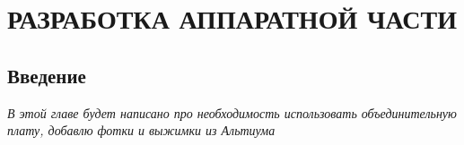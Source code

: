 \chapter{РАЗРАБОТКА АППАРАТНОЙ ЧАСТИ}
\section{Введение}

\textit{В этой главе будет написано про необходимость использовать объединительную плату, добавлю фотки и выжимки из Альтиума}